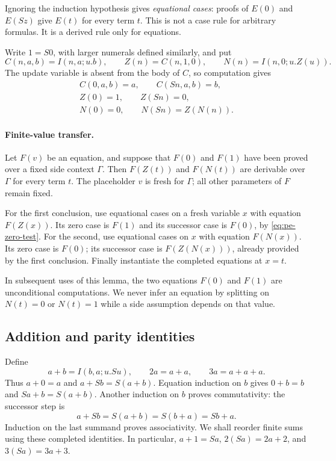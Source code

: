 Ignoring the induction hypothesis gives \emph{equational cases}: proofs of
$E(0)$ and $E(Sz)$ give $E(t)$ for every term $t$.  This is not a case rule
for arbitrary formulas.  It is a derived rule only for equations.

Write $1=S0$, with larger numerals defined similarly, and put
\[
 C(n,a,b)=I(n,a;u.b),\qquad
 Z(n)=C(n,1,0),\qquad
 N(n)=I(n,0;u.Z(u)).
\]
The update variable is absent from the body of $C$, so computation gives
\begin{gather}
 C(0,a,b)=a,\qquad C(Sn,a,b)=b,\label{eq:pe-selector}\\
 Z(0)=1,\qquad Z(Sn)=0,\label{eq:pe-zero-test}\\
 N(0)=0,\qquad N(Sn)=Z(N(n)).\label{eq:pe-parity-rec}
\end{gather}

\paragraph{Finite-value transfer.}
Let $F(v)$ be an equation, and suppose that $F(0)$ and $F(1)$ have been
proved over a fixed side context $\Gamma$.  Then $F(Z(t))$ and $F(N(t))$
are derivable over $\Gamma$ for every term $t$.  The placeholder $v$ is
fresh for $\Gamma$; all other parameters of $F$ remain fixed.

For the first conclusion, use equational cases on a fresh variable $x$
with equation $F(Z(x))$.  Its zero case is $F(1)$ and its successor case is
$F(0)$, by \eqref{eq:pe-zero-test}.  For the second, use equational cases
on $x$ with equation $F(N(x))$.  Its zero case is $F(0)$; its successor
case is $F(Z(N(x)))$, already provided by the first conclusion.
Finally instantiate the completed equations at $x=t$.

In subsequent uses of this lemma, the two equations $F(0)$ and $F(1)$
are unconditional computations.  We never infer an equation by splitting
on $N(t)=0$ or $N(t)=1$ while a side assumption depends on that value.

\subsection{Addition and parity identities}

Define
\[
 a+b=I(b,a;u.Su),\qquad 2a=a+a,\qquad 3a=a+a+a.
\]
Thus $a+0=a$ and $a+Sb=S(a+b)$.  Equation induction on $b$ gives
$0+b=b$ and $Sa+b=S(a+b)$.  Another induction on $b$ proves
commutativity: the successor step is
\[
 a+Sb=S(a+b)=S(b+a)=Sb+a.
\]
Induction on the last summand proves associativity.  We shall reorder
finite sums using these completed identities.  In particular,
$a+1=Sa$, $2(Sa)=2a+2$, and $3(Sa)=3a+3$.

